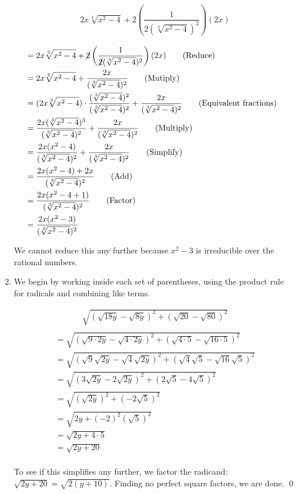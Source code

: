 \begin{ex}
\begin{enumerate}
\begin{multline*}
2x \sqrt[3]{x^2-4} + 2\left(\dfrac{1}{2(\sqrt[3]{x^2-4})^2}\right)  (2x) \\
\end{multline*}
\begin{align*}
& = 2x \sqrt[3]{x^2-4} + \cancel{2}\left(\dfrac{1}{\cancel{2}(\sqrt[3]{x^2-4})^2}\right)  (2x) \tag{Reduce}\\ 
& = 2x \sqrt[3]{x^2-4} + \dfrac{2x}{(\sqrt[3]{x^2-4})^2} \tag{Mutiply} \\
& = (2x \sqrt[3]{x^2-4}) \cdot \dfrac{(\sqrt[3]{x^2-4})^2}{(\sqrt[3]{x^2-4})^2} + \dfrac{2x}{(\sqrt[3]{x^2-4})^2} \tag{Equivalent fractions} \\
& = \dfrac{2x(\sqrt[3]{x^2-4})^3}{(\sqrt[3]{x^2-4})^2} + \dfrac{2x}{(\sqrt[3]{x^2-4})^2} \tag{Multiply}\\
& = \dfrac{2x(x^2-4)}{(\sqrt[3]{x^2-4})^2} + \dfrac{2x}{(\sqrt[3]{x^2-4})^2} \tag{Simplify}\\ 
& = \dfrac{2x(x^2-4) + 2x}{(\sqrt[3]{x^2-4})^2} \tag{Add} \\ 
& = \dfrac{2x(x^2-4 +1)}{(\sqrt[3]{x^2-4})^2} \tag{Factor}\\ 
& = \dfrac{2x(x^2-3)}{(\sqrt[3]{x^2-4})^2} & \\
\end{align*}

We cannot reduce this any further because $x^2 - 3$ is irreducible over the rational numbers. 


\item  We begin by working inside each set of parentheses, using the product rule for radicals and combining like terms.

\begin{multline*}
 \sqrt{(\sqrt{18y} - \sqrt{8y})^2 + (\sqrt{20} - \sqrt{80})^2} \\
\end{multline*}
\begin{align*}
& = \sqrt{(\sqrt{9\cdot 2y} - \sqrt{4 \cdot 2y})^2 + (\sqrt{4\cdot 5} - \sqrt{16 \cdot 5})^2} & \\
& = \sqrt{(\sqrt{9} \sqrt{2y} - \sqrt{4}\sqrt{2y})^2 + (\sqrt{4}\sqrt{5} - \sqrt{16}\sqrt{5})^2} & \\
& = \sqrt{(3\sqrt{2y} - 2\sqrt{2y})^2 + (2\sqrt{5} - 4\sqrt{5})^2} & \\
& = \sqrt{(\sqrt{2y})^2 + (-2\sqrt{5})^2} & \\
& = \sqrt{2y + (-2)^2(\sqrt{5})^2} & \\
& = \sqrt{2y + 4\cdot 5} & \\
& = \sqrt{2y + 20} & \\ 
\end{align*}

To see if this simplifies any further, we factor the radicand:  $\sqrt{2y+20} = \sqrt{2(y+10)}$.  Finding no perfect square factors, we are done. \qed

\end{enumerate}

\end{ex}

